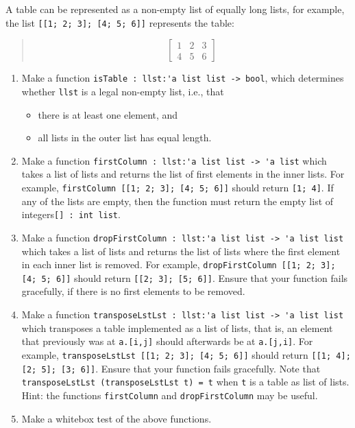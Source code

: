 A table can be represented as a non-empty list of equally long lists, for example, the list \lstinline{[[1; 2; 3]; [4; 5; 6]]} represents the table:
  \begin{quote}
\[\left [\begin{array}{rrr}
1 & 2 & 3 \\
4 & 5 & 6
\end{array}
\right ]\]
\end{quote}
\begin{enumerate}
\item Make a function \lstinline{isTable : llst:'a list list -> bool}, which determines whether \lstinline{llst} is a legal non-empty list, i.e., that
  \begin{itemize}
  \item there is at least one element, and
  \item all lists in the outer list has equal length.
  \end{itemize}
\item Make a function \lstinline{firstColumn : llst:'a list list -> 'a list} which takes a list of lists and returns the list of first elements in the inner lists.  For example, \lstinline{firstColumn [[1; 2; 3]; [4; 5; 6]]} should return \lstinline{[1; 4]}.  If any of the lists are empty, then the function must return the empty list of integers\lstinline{[] : int list}.
\item Make a function \lstinline{dropFirstColumn : llst:'a list list -> 'a list list} which takes a list of lists and returns the list of lists where the first element in each inner list is removed. For example, \lstinline{dropFirstColumn [[1; 2; 3]; [4; 5; 6]]} should return \lstinline{[[2; 3]; [5; 6]]}. Ensure that your function fails gracefully, if there is no first elements to be removed.
\item \label{listTranspose}Make a function \lstinline{transposeLstLst : llst:'a list list -> 'a list list} which transposes a table implemented as a list of lists, that is, an element that previously was at \lstinline{a.[i,j]} should afterwards be at \lstinline{a.[j,i]}. For example, \lstinline{transposeLstLst [[1; 2; 3]; [4; 5; 6]]} should return \lstinline{[[1; 4]; [2; 5]; [3; 6]]}.  Ensure that your function fails gracefully. Note that \lstinline{transposeLstLst (transposeLstLst t) = t} when \lstinline{t} is a table as list of lists. Hint: the functions \lstinline{firstColumn} and \lstinline{dropFirstColumn} may be useful.
\item Make a whitebox test of the above functions.
\end{enumerate}
